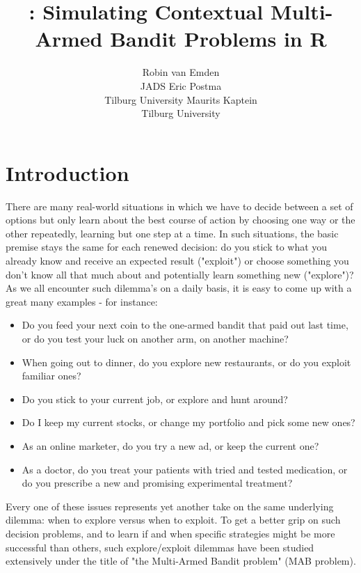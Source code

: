 \documentclass[nojss]{jss}\usepackage[]{graphicx}\usepackage[]{color}
\author{Robin van Emden\\JADS \And
  Eric Postma\\Tilburg University \And
  Maurits Kaptein\\Tilburg University}
\title{\pkg{contextual}: Simulating Contextual Multi-Armed Bandit Problems in R}
\begin{document}






\section{Introduction}

There are many real-world situations in which we have to decide between a set of options but only learn about the best course of action by choosing one way or the other repeatedly, learning but one step at a time. In such situations, the basic premise stays the same for each renewed decision: do you stick to what you already know and receive an expected result ("exploit") or choose something you don't know all that much about and potentially learn something new ("explore")? As we all encounter such dilemma's on a daily basis, it is easy to come up with a great many examples - for instance:

\begin{itemize}
\item Do you feed your next coin to the one-armed bandit that paid out last time, or do you test your luck on another arm, on another machine?
\item When going out to dinner, do you explore new restaurants, or do you exploit familiar ones?
\item Do you stick to your current job, or explore and hunt around?
\item Do I keep my current stocks, or change my portfolio and pick some new ones?
\item As an online marketer, do you try a new ad, or keep the current one?
\item As a doctor, do you treat your patients with tried and tested medication, or do you prescribe a new and promising experimental treatment?
\end{itemize}

Every one of these issues represents yet another take on the same underlying dilemma: when to explore versus when to exploit. To get a better grip on such decision problems, and to learn if and when specific strategies might be
more successful than others, such explore/exploit dilemmas have been studied extensively under the title of "the Multi-Armed Bandit problem" (MAB problem).
\end{document}
